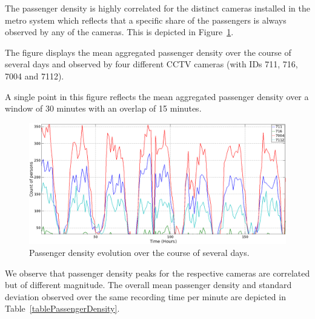 The passenger density is highly correlated for the distinct cameras installed in the metro system which reflects that a specific share of the passengers is always observed by any of the cameras.
This is depicted in Figure~\ref{figureHours}.

The figure displays the mean aggregated passenger density over the course of several days and observed by four different CCTV cameras (with IDs 711, 716, 7004 and 7112).

A single point in this figure reflects the mean aggregated passenger density over a window of 30 minutes with an overlap of 15 minutes.
\begin{figure}
\begin{center}
 \includegraphics[height=.5\columnwidth]{Figures/Figure_PersonCount_Hours.png}
 \caption{Passenger density evolution over the course of several days.}
  \label{figureHours}
  \end{center}
\end{figure}

We observe that passenger density peaks for the respective cameras are correlated but of different magnitude. 
The overall mean passenger density and standard deviation observed over the same recording time per minute are depicted in Table~\ref{tablePassengerDensity}.

